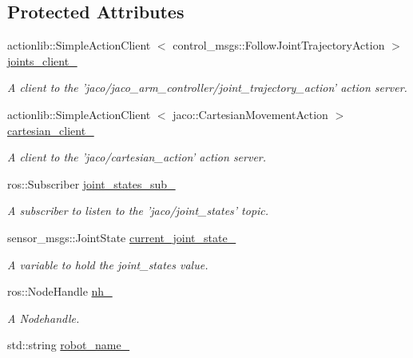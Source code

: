 \subsection*{\-Protected \-Attributes}
\begin{DoxyCompactItemize}
\item 
actionlib\-::\-Simple\-Action\-Client\*
$<$ control\-\_\-msgs\-::\-Follow\-Joint\-Trajectory\-Action $>$ \hyperlink{classexekutor_1_1MoveHandExekutor_a0ac14498741573561e4b6bb25fb9e2ce}{joints\-\_\-client\-\_\-}
\begin{DoxyCompactList}\small\item\em \-A client to the 'jaco/jaco\-\_\-arm\-\_\-controller/joint\-\_\-trajectory\-\_\-action' action server. \end{DoxyCompactList}\item 
actionlib\-::\-Simple\-Action\-Client\*
$<$ jaco\-::\-Cartesian\-Movement\-Action $>$ \hyperlink{classexekutor_1_1MoveHandExekutor_a781e5e4ed50e4d78df1cf8be07e0742e}{cartesian\-\_\-client\-\_\-}
\begin{DoxyCompactList}\small\item\em \-A client to the 'jaco/cartesian\-\_\-action' action server. \end{DoxyCompactList}\item 
ros\-::\-Subscriber \hyperlink{classexekutor_1_1MoveHandExekutor_aa5b9de638dc4a9eb44f68d01e5e19ede}{joint\-\_\-states\-\_\-sub\-\_\-}
\begin{DoxyCompactList}\small\item\em \-A subscriber to listen to the 'jaco/joint\-\_\-states' topic. \end{DoxyCompactList}\item 
sensor\-\_\-msgs\-::\-Joint\-State \hyperlink{classexekutor_1_1MoveHandExekutor_a7334c666e871a0002fc78819f9ca3de9}{current\-\_\-joint\-\_\-state\-\_\-}
\begin{DoxyCompactList}\small\item\em \-A variable to hold the joint\-\_\-states value. \end{DoxyCompactList}\item 
ros\-::\-Node\-Handle \hyperlink{classexekutor_1_1ActionExekutor_a1f0541608c4f27f3c72ab22b1874c882}{nh\-\_\-}
\begin{DoxyCompactList}\small\item\em \-A \-Nodehandle. \end{DoxyCompactList}\item 
std\-::string \hyperlink{classexekutor_1_1ActionExekutor_af165894bbbbabd62c17be857be095936}{robot\-\_\-name\-\_\-}

\end{DoxyCompactItemize}
